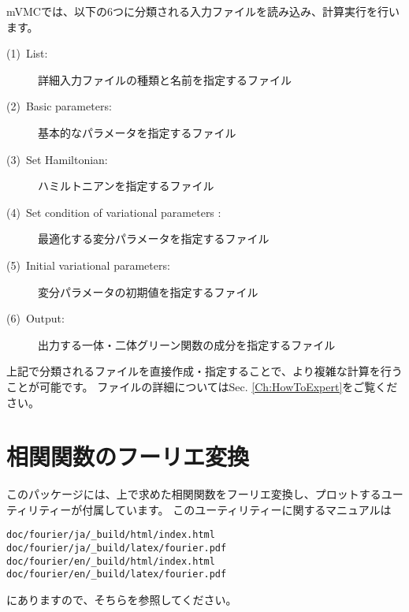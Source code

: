 mVMCでは、以下の6つに分類される入力ファイルを読み込み、計算実行を行います。
\begin{description}
\item[(1)~List:]詳細入力ファイルの種類と名前を指定するファイル
\item[(2)~Basic parameters:]基本的なパラメータを指定するファイル
\item[(3)~Set Hamiltonian:]ハミルトニアンを指定するファイル 
\item[(4)~Set condition of variational parameters :] 最適化する変分パラメータを指定するファイル
\item[(5)~Initial variational parameters:]変分パラメータの初期値を指定するファイル
\item[(6)~Output:]出力する一体・二体グリーン関数の成分を指定するファイル
\end{description}

上記で分類されるファイルを直接作成・指定することで、より複雑な計算を行うことが可能です。
ファイルの詳細についてはSec. \ref{Ch:HowToExpert}をご覧ください。

\section{相関関数のフーリエ変換}

このパッケージには、上で求めた相関関数をフーリエ変換し、プロットするユーティリティーが付属しています。
このユーティリティーに関するマニュアルは
\begin{verbatim}
doc/fourier/ja/_build/html/index.html
doc/fourier/ja/_build/latex/fourier.pdf
doc/fourier/en/_build/html/index.html
doc/fourier/en/_build/latex/fourier.pdf
\end{verbatim}
にありますので、そちらを参照してください。
